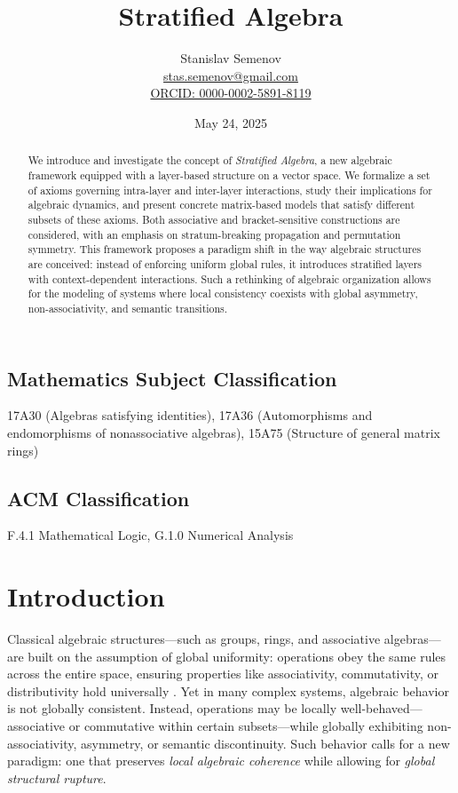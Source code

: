 \documentclass[12pt]{article}
\title{Stratified Algebra}
\author{Stanislav Semenov \\
\href{mailto:stas.semenov@gmail.com}{stas.semenov@gmail.com} \\
\href{https://orcid.org/0000-0002-5891-8119}{ORCID: 0000-0002-5891-8119}}
\date{May 24, 2025}
\theoremstyle{definition}
\theoremstyle{plain}
\theoremstyle{remark}
\begin{document}
\maketitle

\begin{abstract}
We introduce and investigate the concept of \emph{Stratified Algebra}, a new algebraic framework equipped with a layer-based structure on a vector space. We formalize a set of axioms governing intra-layer and inter-layer interactions, study their implications for algebraic dynamics, and present concrete matrix-based models that satisfy different subsets of these axioms. Both associative and bracket-sensitive constructions are considered, with an emphasis on stratum-breaking propagation and permutation symmetry. This framework proposes a paradigm shift in the way algebraic structures are conceived: instead of enforcing uniform global rules, it introduces stratified layers with context-dependent interactions. Such a rethinking of algebraic organization allows for the modeling of systems where local consistency coexists with global asymmetry, non-associativity, and semantic transitions.
\end{abstract}

\subsection*{Mathematics Subject Classification}
17A30 (Algebras satisfying identities), 17A36 (Automorphisms and endomorphisms of nonassociative algebras), 15A75 (Structure of general matrix rings)

\subsection*{ACM Classification}
F.4.1 Mathematical Logic, G.1.0 Numerical Analysis

\section*{Introduction}

Classical algebraic structures—such as groups, rings, and associative algebras—are built on the assumption of global uniformity: operations obey the same rules across the entire space, ensuring properties like associativity, commutativity, or distributivity hold universally \cite{Lang2002,Artin2010,Bourbaki1998,Rotman2015,Jacobson2009}. Yet in many complex systems, algebraic behavior is not globally consistent. Instead, operations may be locally well-behaved—associative or commutative within certain subsets—while globally exhibiting non-associativity, asymmetry, or semantic discontinuity. Such behavior calls for a new paradigm: one that preserves \emph{local algebraic coherence} while allowing for \emph{global structural rupture}.
\end{document}
